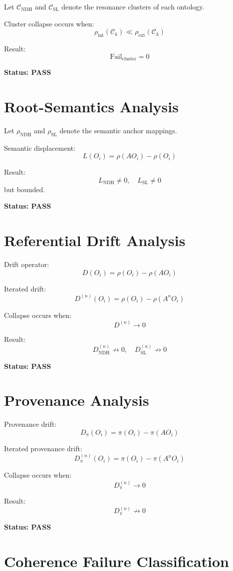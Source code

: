 \documentclass[12pt]{article}
\begin{document}
Let $\mathcal{C}_{\mathrm{NDH}}$ and $\mathcal{C}_{\mathrm{SL}}$ denote the
resonance clusters of each ontology.

Cluster collapse occurs when:
\[
\rho_{\mathrm{int}}(\mathcal{C}_k) \ll \rho_{\mathrm{ext}}(\mathcal{C}_k)
\]

Result:
\[
\mathrm{Fail}_{\mathrm{cluster}} = 0
\]

\textbf{Status: PASS}

\section{Root-Semantics Analysis}

Let $\rho_{\mathrm{NDH}}$ and $\rho_{\mathrm{SL}}$ denote the semantic anchor
mappings.

Semantic displacement:
\[
L(O_i) = \rho(A O_i) - \rho(O_i)
\]

Result:
\[
L_{\mathrm{NDH}} \neq 0, \quad L_{\mathrm{SL}} \neq 0
\]
but bounded.

\textbf{Status: PASS}

\section{Referential Drift Analysis}

Drift operator:
\[
D(O_i) = \rho(O_i) - \rho(A O_i)
\]

Iterated drift:
\[
D^{(n)}(O_i) = \rho(O_i) - \rho(A^n O_i)
\]

Collapse occurs when:
\[
D^{(n)} \to 0
\]

Result:
\[
D^{(n)}_{\mathrm{NDH}} \not\to 0, \quad
D^{(n)}_{\mathrm{SL}} \not\to 0
\]

\textbf{Status: PASS}

\section{Provenance Analysis}

Provenance drift:
\[
D_{\pi}(O_i) = \pi(O_i) - \pi(A O_i)
\]

Iterated provenance drift:
\[
D_{\pi}^{(n)}(O_i) = \pi(O_i) - \pi(A^n O_i)
\]

Collapse occurs when:
\[
D_{\pi}^{(n)} \to 0
\]

Result:
\[
D_{\pi}^{(n)} \not\to 0
\]

\textbf{Status: PASS}

\section{Coherence Failure Classification}
\end{document}
